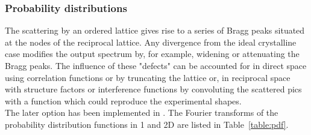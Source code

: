 


\subsubsection{Probability distributions} \label{baftd} 
The scattering by an ordered lattice gives rise to a series of Bragg peaks situated at the nodes of the reciprocal lattice. Any divergence from the ideal crystalline case modifies the output spectrum by, for example, widening or attenuating the Bragg peaks. The influence of these "defects" can be accounted for  in direct space using correlation functions or by truncating the lattice or, in reciprocal space with structure factors or interference functions by convoluting the scattered pics with a function which could reproduce the experimental shapes.\\ The later option has been implemented in \BornAgain. The Fourier transforms of the probability distribution functions in 1 and 2D are listed in Table~\ref{table:pdf}. 

